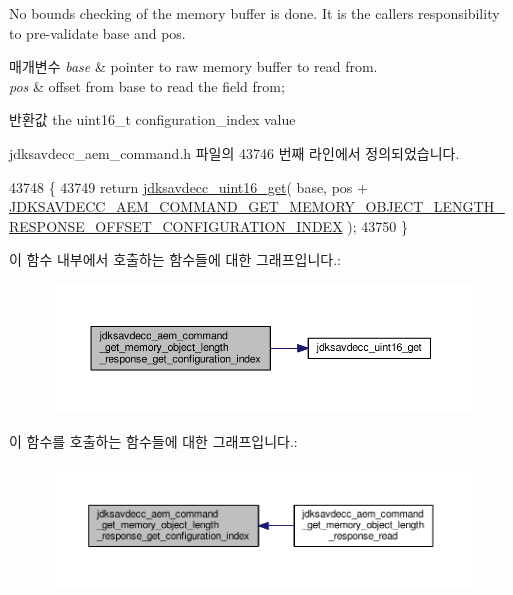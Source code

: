 No bounds checking of the memory buffer is done. It is the caller\textquotesingle{}s responsibility to pre-\/validate base and pos.


\begin{DoxyParams}{매개변수}
{\em base} & pointer to raw memory buffer to read from. \\
\hline
{\em pos} & offset from base to read the field from; \\
\hline
\end{DoxyParams}
\begin{DoxyReturn}{반환값}
the uint16\+\_\+t configuration\+\_\+index value 
\end{DoxyReturn}


jdksavdecc\+\_\+aem\+\_\+command.\+h 파일의 43746 번째 라인에서 정의되었습니다.


\begin{DoxyCode}
43748 \{
43749     \textcolor{keywordflow}{return} \hyperlink{group__endian_ga3fbbbc20be954aa61e039872965b0dc9}{jdksavdecc\_uint16\_get}( base, pos + 
      \hyperlink{group__command__get__memory__object__length__response_gaae1b2c8dd47ad39f0635cbbfac5ba365}{JDKSAVDECC\_AEM\_COMMAND\_GET\_MEMORY\_OBJECT\_LENGTH\_RESPONSE\_OFFSET\_CONFIGURATION\_INDEX}
       );
43750 \}
\end{DoxyCode}


이 함수 내부에서 호출하는 함수들에 대한 그래프입니다.\+:
\nopagebreak
\begin{figure}[H]
\begin{center}
\leavevmode
\includegraphics[width=350pt]{group__command__aem__get__memory__object__length__response_ga3d589633c277ced79ab91fd3b1de7381_cgraph}
\end{center}
\end{figure}




이 함수를 호출하는 함수들에 대한 그래프입니다.\+:
\nopagebreak
\begin{figure}[H]
\begin{center}
\leavevmode
\includegraphics[width=350pt]{group__command__aem__get__memory__object__length__response_ga3d589633c277ced79ab91fd3b1de7381_icgraph}
\end{center}
\end{figure}



